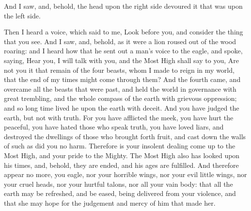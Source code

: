 {And I saw, and, behold, the head upon the right side devoured it that was upon the left side.
\par }{\PP {}Then I heard a voice, which said to me, Look before you, and consider the thing that you see.
And I saw, and, behold, as it were a lion roused out of the wood roaring: and I heard how that he sent out a man’s voice to the eagle, and spoke, saying,
Hear you, I will talk with you, and the Most High shall say to you,
Are not you it that remain of the four beasts, whom I made to reign in my world, that the end of my times might come through them?
And the fourth came, and overcame all the beasts that were past, and held the world in governance with great trembling, and the whole compass of the earth with grievous oppression; and so long time lived he upon the earth with deceit.
And you have judged the earth, but not with truth.
For you have afflicted the meek, you have hurt the peaceful, you have hated those who speak truth, you have loved liars, and destroyed the dwellings of those who brought forth fruit, and cast down the walls of such as did you no harm.
Therefore is your insolent dealing come up to the Most High, and your pride to the Mighty.
The Most High also has looked upon his times, and, behold, they are ended, and his ages are fulfilled.
And therefore appear no more, you eagle, nor your horrible wings, nor your evil little wings, nor your cruel heads, nor your hurtful talons, nor all your vain body:
that all the earth may be refreshed, and be eased, being delivered from your violence, and that she may hope for the judgement and mercy of him that made her.

}
